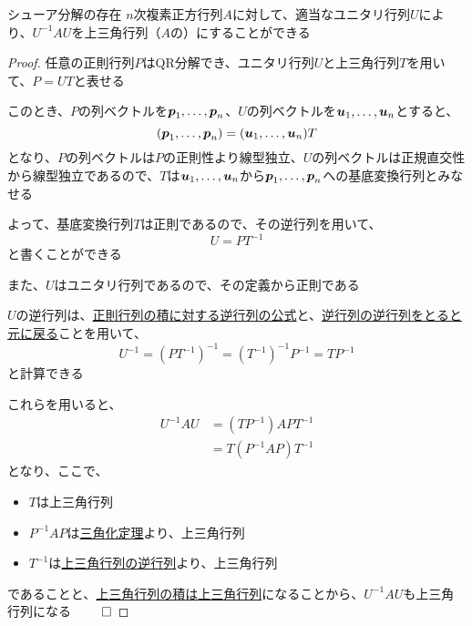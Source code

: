 \documentclass[../../../topic_linear-algebra]{subfiles}
\begin{document}
\begin{theorem}{シューア分解の存在}
  $n$次複素正方行列$A$に対して、適当なユニタリ行列$U$により、$U^{-1}AU$を上三角行列（$A$の）にすることができる
\end{theorem}

\begin{proof}
  任意の正則行列$P$はQR分解でき、ユニタリ行列$U$と上三角行列$T$を用いて、$P = UT$と表せる

  このとき、$P$の列ベクトルを$\vb*{p}_1,\ldots,\vb*{p}_n$、$U$の列ベクトルを$\vb*{u}_1,\ldots,\vb*{u}_n$とすると、
  \begin{equation*}
    (\vb*{p}_1,\ldots,\vb*{p}_n) = (\vb*{u}_1,\ldots,\vb*{u}_n) T
  \end{equation*}
  となり、$P$の列ベクトルは$P$の正則性より線型独立、$U$の列ベクトルは正規直交性から線型独立であるので、$T$は$\vb*{u}_1,\ldots,\vb*{u}_n$から$\vb*{p}_1,\ldots,\vb*{p}_n$への基底変換行列とみなせる

  よって、基底変換行列$T$は正則であるので、その逆行列を用いて、
  \begin{equation*}
    U = P T^{-1}
  \end{equation*}
  と書くことができる

  \br

  また、$U$はユニタリ行列であるので、その定義から正則である

  $U$の逆行列は、\hyperref[thm:inverse-of-product]{正則行列の積に対する逆行列の公式}と、\hyperref[thm:inverse-of-inverse]{逆行列の逆行列をとると元に戻る}ことを用いて、
  \begin{equation*}
    U^{-1} =(P T^{-1})^{-1} = (T^{-1})^{-1} P^{-1} = T P^{-1}
  \end{equation*}
  と計算できる

  \br

  これらを用いると、
  \begin{align*}
    U^{-1}AU & = (T P^{-1})A P T^{-1} \\
             & = T (P^{-1}AP) T^{-1}
  \end{align*}
  となり、ここで、
  \begin{itemize}
    \item $T$は上三角行列
    \item $P^{-1}AP$は\hyperref[thm:triangularization-theorem]{三角化定理}より、上三角行列
    \item $T^{-1}$は\hyperref[thm:inverse-of-upper-triangular]{上三角行列の逆行列}より、上三角行列
  \end{itemize}
  であることと、\hyperref[thm:product-of-upper-triangular]{上三角行列の積は上三角行列}になることから、$U^{-1}AU$も上三角行列になる $\qed$
\end{proof}
\end{document}

